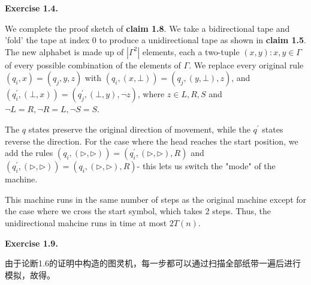 \documentclass[a4paper]{article}
\newenvironment{exercise}[1]{
	\par
	\noindent\textbf{Exercise #1.}\quad
}{
	\par
	\bigskip
}
\begin{document}
\begin{exercise}{1.4}
    We complete the proof sketch of \textbf{claim 1.8}. We take a bidirectional tape and 'fold' the tape at index 0 to produce a unidirectional tape as shown in \textbf{claim 1.5}. The new alphabet is made up of $|\Gamma^2|$ elements, each a two-tuple $(x,y):x,y \in \Gamma$ of every possible combination of the elements of $\Gamma$. We replace every original  rule $(q_i,x)=(q_j,y,z)$ with $(q_i,(x,\bot))=(q_j,(y,\bot),z)$, and $(q^{\prime}_i,(\bot,x))=(q^{\prime}_j,(\bot,y),\lnot z)$, where $z \in {L,R,S}$ and $\lnot L=R,\lnot R=L, \lnot S=S$.
    
    The $q$ states preserve the original direction of movement, while the $q^{\prime}$ states reverse the direction. For the case where the head  reaches the start position, we add the rules $(q_i,(\rhd,\rhd))=(q^{\prime}_i,(\rhd,\rhd),R)$ and $(q^{\prime}_i,(\rhd,\rhd))=(q_i,(\rhd,\rhd),R)$- this lets us switch the "mode" of the machine.
    
    This machine runs in the same number of steps as the original machine except for the case where we cross the start symbol, which takes 2 steps. Thus, the unidirectional mahcine runs in time at most $2T(n)$.
\end{exercise}

\begin{exercise}{1.9}
    由于论断1.6的证明中构造的图灵机，每一步都可以通过扫描全部纸带一遍后进行模拟，故得。
\end{exercise}
\end{document}
